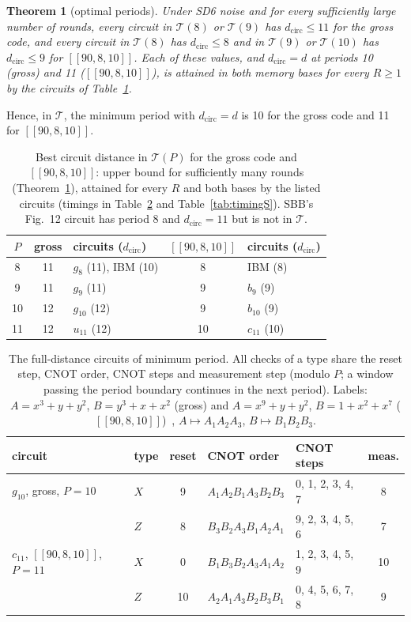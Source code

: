 \documentclass[aps,prl,twocolumn,superscriptaddress,nofootinbib]{revtex4-2}
\newcommand{\dcirc}{d_{\mathrm{circ}}}
\newcommand{\code}[1]{[[#1]]}
\newcommand{\T}{\mathcal{T}}
\newtheorem{theorem}{Theorem}
\begin{document}
\begin{theorem}[optimal periods]\label{thm:main}
Under SD6 noise and for every sufficiently large number of rounds, every circuit in
$\T(8)$ or $\T(9)$ has $\dcirc\le11$ for the gross code, and every circuit in $\T(8)$
has $\dcirc\le8$ and in $\T(9)$ or $\T(10)$ has $\dcirc\le9$ for $\code{90,8,10}$. Each of
these values, and $\dcirc=d$ at periods 10 (gross) and 11 ($\code{90,8,10}$), is attained
in both memory bases for every $R\ge1$ by the circuits of Table~\ref{tab:periods}.
\end{theorem}
\noindent Hence, in $\T$, the minimum period with $\dcirc=d$ is 10 for the gross code and
11 for $\code{90,8,10}$.

\begin{table}[t]
\caption{Best circuit distance in $\T(P)$ for the gross code and $\code{90,8,10}$: upper bound for sufficiently many rounds
(Theorem~\ref{thm:main}), attained for every $R$ and both bases by the listed circuits
(timings in Table~\ref{tab:timing} and Table~\ref{tab:timingS}). SBB's Fig.~12 circuit has period 8 and $\dcirc=11$
but is not in $\T$.}
\label{tab:periods}
\begin{ruledtabular}
\begin{tabular}{cclcl}
$P$ & gross & circuits ($\dcirc$) & $\code{90,8,10}$ & circuits ($\dcirc$)\\
\hline
8 & 11 & $g_8$ (11), IBM (10) & 8 & IBM (8)\\
9 & 11 & $g_9$ (11) & 9 & $b_9$ (9)\\
10 & 12 & $g_{10}$ (12) & 9 & $b_{10}$ (9)\\
11 & 12 & $u_{11}$ (12) & 10 & $c_{11}$ (10)\\
\end{tabular}
\end{ruledtabular}
\end{table}

\begin{table}[t]
\caption{The full-distance circuits of minimum period. All checks of a type share the
reset step, CNOT order, CNOT steps and measurement step (modulo $P$; a window passing the
period boundary continues in the next period). Labels: $A=x^3+y+y^2$, $B=y^3+x+x^2$
(gross) and $A=x^9+y+y^2$, $B=1+x^2+x^7$ ($\code{90,8,10}$)~\cite{Bravyi2024},
$A\mapsto A_1A_2A_3$, $B\mapsto B_1B_2B_3$.}
\label{tab:timing}
\begin{ruledtabular}
\begin{tabular}{llcllc}
circuit & type & reset & CNOT order & CNOT steps & meas.\\
\hline
$g_{10}$, gross, $P=10$ & $X$ & 9 & $A_1A_2B_1A_3B_2B_3$ & 0, 1, 2, 3, 4, 7 & 8\\
 & $Z$ & 8 & $B_3B_2A_3B_1A_2A_1$ & 9, 2, 3, 4, 5, 6 & 7\\
$c_{11}$, $\code{90,8,10}$, $P=11$ & $X$ & 0 & $B_1B_3B_2A_3A_1A_2$ & 1, 2, 3, 4, 5, 9 & 10\\
 & $Z$ & 10 & $A_2A_1A_3B_2B_3B_1$ & 0, 4, 5, 6, 7, 8 & 9\\
\end{tabular}
\end{ruledtabular}
\end{table}
\end{document}
